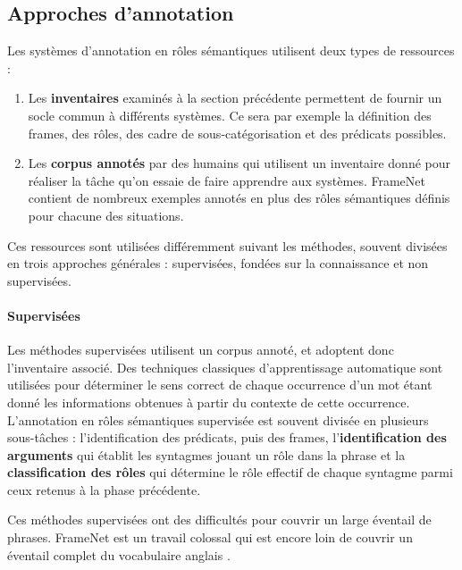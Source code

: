 
\subsection{Approches d'annotation}

Les systèmes d'annotation en rôles sémantiques utilisent deux types de
ressources :

\begin{enumerate}
    \item Les \textbf{inventaires} examinés à la section précédente permettent
        de fournir un socle commun à différents systèmes. Ce sera par exemple
        la définition des frames, des rôles, des cadre de sous-catégorisation
        et des prédicats possibles.
    \item Les \textbf{corpus annotés} par des humains qui utilisent un
        inventaire donné pour réaliser la tâche qu'on essaie de faire apprendre
        aux systèmes. FrameNet contient de nombreux exemples annotés en plus
        des rôles sémantiques définis pour chacune des situations.
\end{enumerate}

Ces ressources sont utilisées différemment suivant les méthodes, souvent
divisées en trois approches générales : supervisées, fondées sur la
connaissance et non supervisées.

\paragraph{Supervisées}

Les méthodes supervisées
\citep{gildea2002automatic,surdeanu2008conll,das2014frame,hermann2014semantic}
utilisent un corpus annoté, et adoptent donc l'inventaire associé. Des
techniques classiques d'apprentissage automatique sont utilisées pour
déterminer le sens correct de chaque occurrence d'un mot étant donné les
informations obtenues à partir du contexte de cette occurrence.  L'annotation
en rôles sémantiques supervisée est souvent divisée en plusieurs sous-tâches :
l'identification des prédicats, puis des frames, l'\textbf{identification des
arguments} qui établit les syntagmes jouant un rôle dans la phrase et la
\textbf{classification des rôles} qui détermine le rôle effectif de chaque
syntagme parmi ceux retenus à la phase précédente.

Ces méthodes supervisées ont des difficultés pour couvrir un large éventail de
phrases. FrameNet est un travail colossal qui est encore loin de couvrir un
éventail complet du vocabulaire anglais \citep[p.~155]{marquez2008semantic}.

